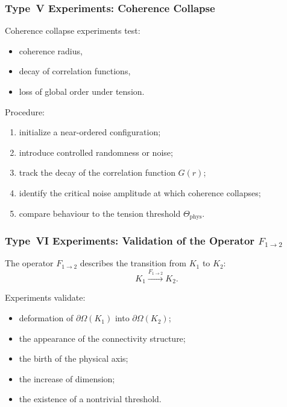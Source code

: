 \subsubsection{Type~V Experiments: Coherence Collapse}

Coherence collapse experiments test:

\begin{itemize}
    \item coherence radius,
    \item decay of correlation functions,
    \item loss of global order under tension.
\end{itemize}

Procedure:

\begin{enumerate}
    \item initialize a near-ordered configuration;
    \item introduce controlled randomness or noise;
    \item track the decay of the correlation function $G(r)$;
    \item identify the critical noise amplitude at which coherence
          collapses;
    \item compare behaviour to the tension threshold $\Theta_{\mathrm{phys}}$.
\end{enumerate}



\subsubsection{Type~VI Experiments: Validation of the Operator $F_{1\rightarrow 2}$}

The operator $F_{1\rightarrow 2}$ describes the transition from $K_1$ to $K_2$:
\[
   K_1 \xrightarrow{F_{1\rightarrow 2}} K_2.
\]

Experiments validate:

\begin{itemize}
    \item deformation of $\partial\Omega(K_1)$ into
          $\partial\Omega(K_2)$;
    \item the appearance of the connectivity structure;
    \item the birth of the physical axis;
    \item the increase of dimension;
    \item the existence of a nontrivial threshold.
\end{itemize}

